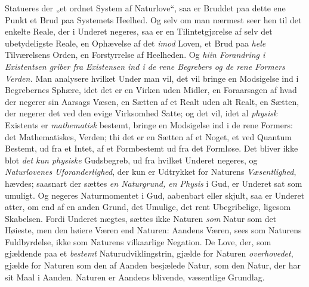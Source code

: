 \documentclass[12pt,a4paper]{book}
\newcommand{\opage}[1]{\marginnote{\footnotesize\textit{[#1]}}}
\begin{document}
Statueres der „et ordnet System af Naturlove“, saa er Bruddet paa dette ene Punkt et Brud
paa Systemets Heelhed. Og selv om man nærmest seer hen til det enkelte Reale, der i
Underet negeres, saa er en Tilintetgjørelse af selv det ubetydeligste Reale, en Ophævelse
af det \emph{imod} Loven, et Brud paa \emph{hele} Tilværelsens Orden, en Forstyrrelse af Heelheden.
Og \emph{hiin Forandring i Existentsen griber fra Existensen ind i de rene Begrebers og de
rene Formers Verden.} Man analysere \opage{85}hvilket Under man vil, det vil bringe en Modsigelse
ind i Begrebernes Sphære, idet det er en Virken uden Midler, en Foraarsagen af hvad der
negerer sin Aarsags Væsen, en Sætten af et Realt uden alt Realt, en Sætten, der negerer
det ved den evige Virksomhed Satte; og det vil, idet al \emph{physisk} Existents er \emph{mathematisk} bestemt, bringe en Modsigelse ind i de rene Formers: det Mathematiskes,
Verden; thi det er en Sætten af et Noget, et ved Quantum Bestemt, ud fra et Intet, af et
Formbestemt ud fra det Formløse. Det bliver ikke blot \emph{det kun physiske} Gudsbegreb, ud fra
hvilket Underet negeres, og \emph{Naturlovenes Uforanderlighed}, der kun er Udtrykket for Naturens \emph{Væsentlighed}, hævdes; saasnart der sættes \emph{en Naturgrund, en Physis} i Gud, er
Underet sat som umuligt. Og negeres Naturmomentet i Gud, aabenbart eller skjult, saa er
Underet atter, om end af en anden Grund, det Umulige, det rent Ubegribelige, ligesom
Skabelsen. Fordi Underet nægtes, sættes ikke Naturen \emph{som} Natur som det Høieste, men den
høiere Væren end Naturen: Aandens Væren, sees som Naturens Fuldbyrdelse, ikke som Naturens
vilkaarlige Negation. De Love, der, som gjældende paa et \emph{bestemt}
Naturudviklingstrin, gjælde for Naturen \emph{overhovedet}, gjælde for Naturen som den af Aanden
besjælede Natur, som den Natur, der har sit Maal i Aanden. Naturen er Aandens blivende,
væsentlige Grundlag.
\end{document}
